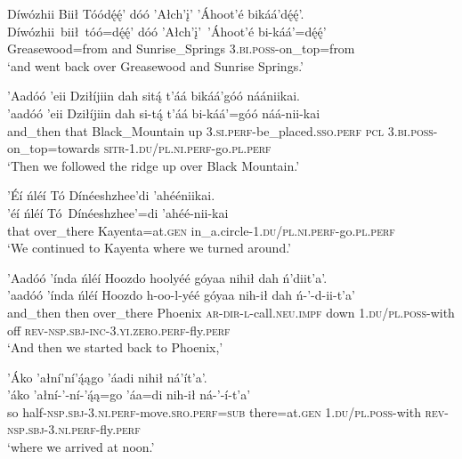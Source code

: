\ea\label{ex:text9-3-23}
Díwózhii Biił Tóódę́ę́’ dóó ’Ałch’į’ ’Áhoot’é bikáá’dę́ę́’.\\
\gll Díwózhii~biił~{tóó=dę́ę́’}	dóó	’Ałch’į’~{’Áhoot’é}	bi-káá’=dę́ę́’\\
     Greasewood=from	and	Sunrise\_Springs	3.\textsc{bi}.\textsc{poss}-on\_top=from\\
\glt `and went back over Greasewood and Sunrise Springs.'
\z

\ea\label{ex:text9-3-24}
’Aadóó ’eii Dziłíjiin dah sitą́ t’áá bikáá’góó náániikai.\\
\gll ’aadóó	’eii	Dziłíjiin	dah si-tą́	t’áá	bi-káá’=góó	náá-nii-kai\\
     and\_then	that	Black\_Mountain	up 3.\textsc{si}.\textsc{perf}-be\_placed.\textsc{sso}.\textsc{perf}	\textsc{pcl}	3.\textsc{bi}.\textsc{poss}-on\_top=towards	\textsc{sitr}-1.\textsc{du}/\textsc{pl}.\textsc{ni}.\textsc{perf}-go.\textsc{pl}.\textsc{perf}\\
\glt `Then we followed the ridge up over Black Mountain.'
\z

\ea\label{ex:text9-3-25}
’Éí ńléí Tó Dínéeshzhee’di ’ahééniikai.\\
\gll ’éí	ńléí	Tó~{Dínéeshzhee’=di}	’ahéé-nii-kai\\
     that	over\_there	Kayenta=at.\textsc{gen}	in\_a.circle-1.\textsc{du}/\textsc{pl}.\textsc{ni}.\textsc{perf}-go.\textsc{pl}.\textsc{perf}\\
\glt `We continued to Kayenta where we turned around.'
\z

\ea\label{ex:text9-3-26}
’Aadóó ’índa ńléí Hoozdo hoolyéé góyaa nihił dah ń’diit’a’.\\
\gll ’aadóó	’índa	ńléí	Hoozdo	h-oo-l-yéé	góyaa	nih-ił	dah	ń-’-d-ii-t’a’\\
     and\_then	then	over\_there	Phoenix	\textsc{ar}-\textsc{dir}-\textsc{l}-call.\textsc{neu}.\textsc{impf}	down	1.\textsc{du}/\textsc{pl}.\textsc{poss}-with	off	\textsc{rev}-\textsc{nsp}.\textsc{sbj}-\textsc{inc}-3.\textsc{yi}.\textsc{zero}.\textsc{perf}-fly.\textsc{perf}\\
\glt `And then we started back to Phoenix,'
\z

\ea\label{ex:text9-3-27}
’Áko ’ałní’ní’ą́ągo ’áadi nihił ná’ít’a’.\\
\gll ’áko	’ałní-’-ní-’ą́ą=go	’áa=di	nih-ił	ná-’-í-t’a’\\
     so	half-\textsc{nsp}.\textsc{sbj}-3.\textsc{ni}.\textsc{perf}-move.\textsc{sro}.\textsc{perf}=\textsc{sub}	there=at.\textsc{gen}	1.\textsc{du}/\textsc{pl}.\textsc{poss}-with	\textsc{rev}-\textsc{nsp}.\textsc{sbj}-3.\textsc{ni}.\textsc{perf}-fly.\textsc{perf}\\
\glt `where we arrived at noon.'
\z

